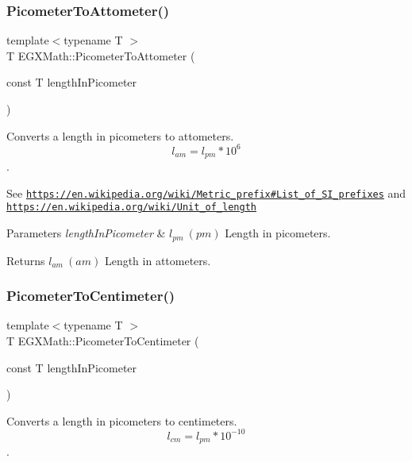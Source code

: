 \subsubsection{\texorpdfstring{Picometer\+To\+Attometer()}{PicometerToAttometer()}}
{\footnotesize\ttfamily template$<$typename T $>$ \\
T E\+G\+X\+Math\+::\+Picometer\+To\+Attometer (\begin{DoxyParamCaption}\item[{const T}]{length\+In\+Picometer }\end{DoxyParamCaption})}



Converts a length in picometers to attometers. \[ l_{am}=l_{pm} * 10^{6} \]. 

See \href{https://en.wikipedia.org/wiki/Metric_prefix#List_of_SI_prefixes}{\tt https\+://en.\+wikipedia.\+org/wiki/\+Metric\+\_\+prefix\#\+List\+\_\+of\+\_\+\+S\+I\+\_\+prefixes} and \href{https://en.wikipedia.org/wiki/Unit_of_length}{\tt https\+://en.\+wikipedia.\+org/wiki/\+Unit\+\_\+of\+\_\+length} 
\begin{DoxyParams}{Parameters}
{\em length\+In\+Picometer} & $ l_{pm}\ (pm)$ Length in picometers. \\
\hline
\end{DoxyParams}
\begin{DoxyReturn}{Returns}
$ l_{am}\ (am)$ Length in attometers. 
\end{DoxyReturn}
\mbox{\label{group___e_g_x_math-_conversions-_length_conversions-_s_i-_picometer-_s_i_gabb7609315d88da8dd25575caf15a5e06}} 
\subsubsection{\texorpdfstring{Picometer\+To\+Centimeter()}{PicometerToCentimeter()}}
{\footnotesize\ttfamily template$<$typename T $>$ \\
T E\+G\+X\+Math\+::\+Picometer\+To\+Centimeter (\begin{DoxyParamCaption}\item[{const T}]{length\+In\+Picometer }\end{DoxyParamCaption})}



Converts a length in picometers to centimeters. \[ l_{cm}=l_{pm} * 10^{-10} \]. 

